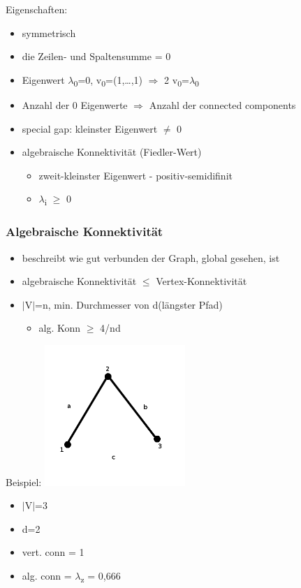 Eigenschaften:\\
\begin{itemize}
	\item symmetrisch
	\item die Zeilen- und Spaltensumme = 0
	\item Eigenwert $\lambda$\textsubscript{0}=0, v\textsubscript{0}=(1,\ldots,1) $\Rightarrow$ 2 v\textsubscript{0}=$\lambda$\textsubscript{0}
	\item Anzahl der 0 Eigenwerte $\Rightarrow$ Anzahl der connected components
	\item special gap: kleinster Eigenwert $\neq$ 0
	\item algebraische Konnektivität (Fiedler-Wert)
	\begin{itemize}
		\item zweit-kleinster Eigenwert - positiv-semidifinit
		\item $\lambda$\textsubscript{i} $\geq$ 0
	\end{itemize}
\end{itemize}

\subsubsection{Algebraische Konnektivität}
\begin{itemize}
	\item beschreibt wie gut verbunden der Graph, global gesehen, ist
	\item algebraische Konnektivität $\leq$ Vertex-Konnektivität
	\item $\mid$V$\mid$=n, min. Durchmesser von d(längster Pfad)
	\begin{itemize}
		\item alg. Konn $\geq$ 4/nd
	\end{itemize}
\end{itemize}

Beispiel:
\includegraphics[width=0.4\textwidth]{lectures/161028/pix/dreieck.png}\newline
\begin{itemize}
	\item $\mid$V$\mid$=3
	\item d=2\newline
	\item vert. conn = 1
	\item alg. conn = $\lambda$\textsubscript{z} = 0,666 
\end{itemize}

